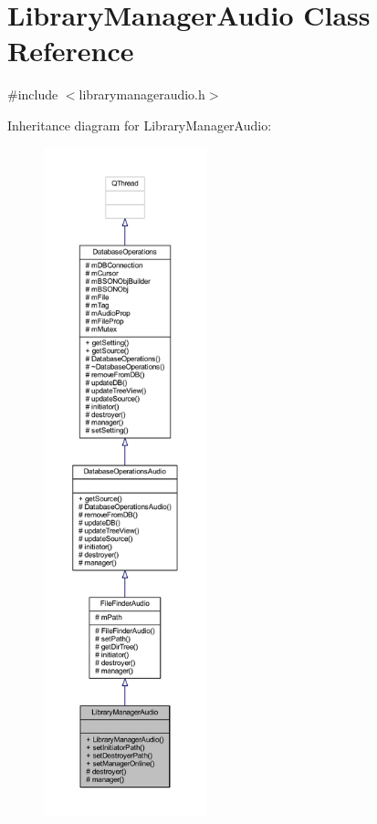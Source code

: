 \hypertarget{class_library_manager_audio}{\section{Library\-Manager\-Audio Class Reference}
\label{class_library_manager_audio}
}


{\ttfamily \#include $<$librarymanageraudio.\-h$>$}



Inheritance diagram for Library\-Manager\-Audio\-:
\nopagebreak
\begin{figure}[H]
\begin{center}
\leavevmode
\includegraphics[height=550pt]{class_library_manager_audio__inherit__graph}
\end{center}
\end{figure}


